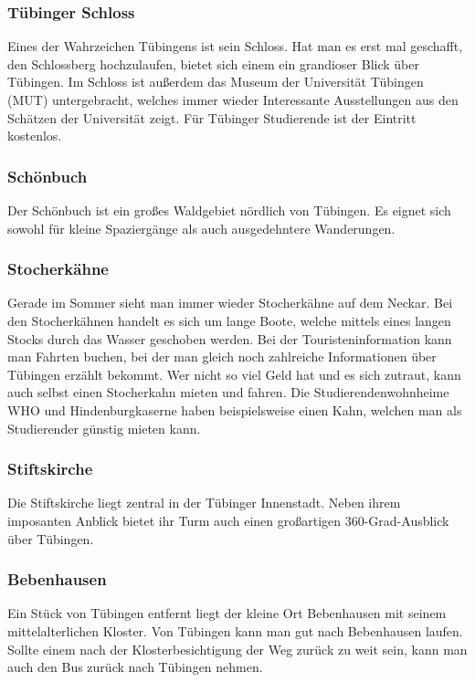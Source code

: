 
\subsubsection*{Tübinger Schloss}
Eines der Wahrzeichen Tübingens ist sein Schloss. Hat man es erst mal geschafft, den Schlossberg hochzulaufen, bietet sich einem ein grandioser Blick über Tübingen. Im Schloss ist außerdem das Museum der Universität Tübingen (MUT) untergebracht, welches immer wieder Interessante Ausstellungen aus den Schätzen der Universität zeigt. Für Tübinger Studierende ist der Eintritt kostenlos.

\subsubsection*{Schönbuch}
Der Schönbuch ist ein großes Waldgebiet nördlich von Tübingen. Es eignet sich sowohl für kleine Spaziergänge als auch ausgedehntere Wanderungen.

\subsubsection*{Stocherkähne}
Gerade im Sommer sieht man immer wieder Stocherkähne auf dem Neckar. Bei den Stocherkähnen handelt es sich um lange Boote, welche mittels eines langen Stocks durch das Wasser geschoben werden. Bei der Touristeninformation kann man Fahrten buchen, bei der man gleich noch zahlreiche Informationen über Tübingen erzählt bekommt. Wer nicht so viel Geld hat und es sich zutraut, kann auch selbst einen Stocherkahn mieten und fahren. Die Studierendenwohnheime WHO und Hindenburgkaserne haben beispielsweise einen Kahn, welchen man als Studierender günstig mieten kann.

\subsubsection*{Stiftskirche}
Die Stiftskirche liegt zentral in der Tübinger Innenstadt. Neben ihrem imposanten Anblick bietet ihr Turm auch einen großartigen 360-Grad-Ausblick über Tübingen. 

\subsubsection*{Bebenhausen}
Ein Stück von Tübingen entfernt liegt der kleine Ort Bebenhausen mit seinem mittelalterlichen Kloster. Von Tübingen kann man gut nach Bebenhausen laufen. Sollte einem nach der Klosterbesichtigung der Weg zurück zu weit sein, kann man auch den Bus zurück nach Tübingen nehmen.

